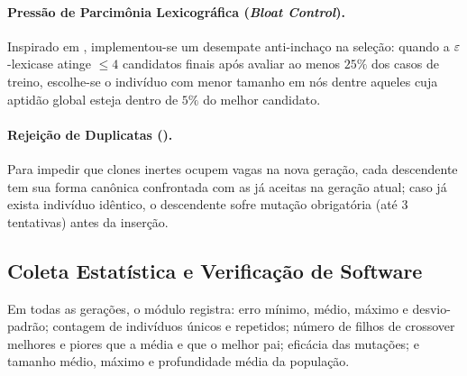 \paragraph{Pressão de Parcimônia Lexicográfica (\emph{Bloat Control}).}
Inspirado em \citet{luke2002lexicographic}, implementou-se um desempate
anti-inchaço na seleção: quando a $\varepsilon$-lexicase atinge $\le 4$ candidatos
finais após avaliar ao menos $25\%$ dos casos de treino, escolhe-se o
indivíduo com menor tamanho em nós dentre aqueles cuja aptidão global esteja
dentro de $5\%$ do melhor candidato.

\paragraph{Rejeição de Duplicatas ().}
Para impedir que clones inertes ocupem vagas na nova geração, cada descendente
tem sua forma canônica confrontada com as já aceitas na geração atual; caso já
exista indivíduo idêntico, o descendente sofre mutação obrigatória (até 3
tentativas) antes da inserção.

\subsection{Coleta Estatística e Verificação de Software}
\label{sec:impl_testes}

Em todas as gerações, o módulo  registra: erro mínimo, médio,
máximo e desvio-padrão; contagem de indivíduos únicos e repetidos; número de
filhos de crossover melhores e piores que a média e que o melhor pai; eficácia
das mutações; e tamanho médio, máximo e profundidade média da população.